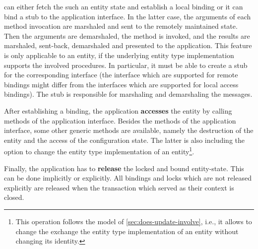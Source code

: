 \documentclass[a4paper, 10pt]{book}
\begin{document}
\begin{description}
\begin{description}
                                can either fetch the such an entity state and establish a local
                                binding or it can bind a stub to the application interface. In the
                                latter case, the arguments of each method invocation are
                                marshaled and sent to the remotely maintained state. Then the
                                arguments are demarshaled, the method is invoked, and the results
                                are marshaled, sent-back, demarshaled and presented to the
                                application. 
                                This feature is only applicable to an entity, if the underlying
                                entity type implementation supports the involved procedures. In
                                particular, it must be able to create a stub for the corresponding
                                interface (the interface which are supported for remote bindings
                                might differ from the interfaces which are supported for local
                                access bindings). The stub is responsible for marshaling and
                                demarshaling the messages.
                        \end{description}
                    \item After establishing a binding, the application \textbf{accesses}
                        the entity by calling methods of the application interface. Besides
                        the methods of the application interface, some other generic methods
                        are available, namely the destruction of the entity and the access
                        of the configuration state. The latter is also including the option
                        to change the entity type implementation of an entity\footnote{This
                        operation follows the model of \vref{sec:does-update-involve},
                        i.e., it allows to change the exchange the entity type
                        implementation of an entity without changing its identity.}.
                    \item Finally, the application has to \textbf{release} the locked and
                        bound entity-state. This can be done implicitly or explicitly. All
                        bindings and locks which are not released explicitly are released
                        when the transaction which served as their context is closed.
                \end{description}
\end{document}
